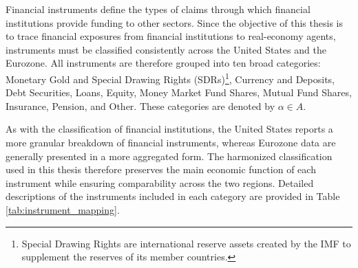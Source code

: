 Financial instruments define the types of claims through which financial institutions provide funding to other sectors. Since the objective of this thesis is to trace financial exposures from financial institutions to real-economy agents, instruments must be classified consistently across the United States and the Eurozone. All instruments are therefore grouped into ten broad categories: Monetary Gold and Special Drawing Rights (SDRs)\footnote{Special Drawing Rights are international reserve assets created by the IMF to supplement the reserves of its member countries.}, Currency and Deposits, Debt Securities, Loans, Equity, Money Market Fund Shares, Mutual Fund Shares, Insurance, Pension, and Other. These categories are denoted by $\alpha \in A$.

As with the classification of financial institutions, the United States reports a more granular breakdown of financial instruments, whereas Eurozone data are generally presented in a more aggregated form. The harmonized classification used in this thesis therefore preserves the main economic function of each instrument while ensuring comparability across the two regions. Detailed descriptions of the instruments included in each category are provided in Table \ref{tab:instrument_mapping}.

